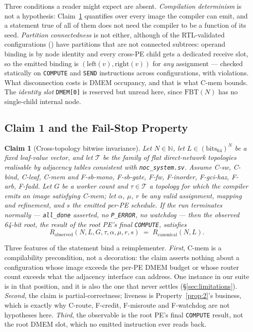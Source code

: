 \documentclass[journal,10pt]{IEEEtran}
\theoremstyle{plain}
\newtheorem{claim}{Claim}
\theoremstyle{definition}
\theoremstyle{remark}
\newcommand{\FBT}{\ensuremath{\mathrm{FBT}}}
\newcommand{\Rcan}{\ensuremath{R_{\mathrm{canonical}}}}
\newcommand{\sv}[1]{\texttt{#1}}
\newcommand{\T}{\ensuremath{\mathcal{T}}}
\newcommand{\asgn}{\ensuremath{\alpha}}
\newcommand{\map}{\ensuremath{\mu}}
\begin{document}
Three conditions a reader might expect are absent. \emph{Compilation
determinism} is not a hypothesis: Claim~\ref{claim:1} quantifies over every
image the compiler can emit, and a statement true of all of them does not need
the compiler to be a function of its seed. \emph{Partition connectedness} is
not either, although \DisconnCount{} of the RTL-validated configurations
(\DisconnShare{}) have partitions that are not connected subtrees: operand
binding is by node identity and every cross-PE child gets a dedicated receive
slot, so the emitted binding is $(\mathrm{left}(v),\mathrm{right}(v))$ for
\emph{any} assignment --- checked statically on \BindComputes{}
\texttt{COMPUTE} and \BindSends{} \texttt{SEND} instructions across
\BindConfigs{} configurations, with \BindViolations{} violations. What
disconnection costs is DMEM occupancy, and that is what \textsf{C-mem} bounds.
The \emph{identity slot} \texttt{DMEM[0]} is reserved but unread here, since
$\FBT(N)$ has no single-child internal node.

\subsection{Claim 1 and the Fail-Stop Property}\label{sec:abi-claim}

\begin{claim}[Cross-topology bitwise invariance]\label{claim:1}
Let $N \in \mathbb{N}$, let $L \in (\mathrm{bits}_{64})^N$ be a fixed
leaf-value vector, and let $\T$ be the family of flat direct-network
topologies realisable by adjacency tables consistent with
\sv{noc\_system.sv}. Assume \textsf{C-sw}, \textsf{C-bind}, \textsf{C-leaf},
\textsf{C-mem} and \textsf{F-sb-mono}, \textsf{F-sb-gate}, \textsf{F-fw},
\textsf{F-inorder}, \textsf{F-gci-haz}, \textsf{F-arb}, \textsf{F-fadd}. Let
$G$ be a worker count and $\tau \in \T$ a topology for which the compiler
emits an image satisfying \textsf{C-mem}; let $\asgn$, $\map$, $r$ be any
valid assignment, mapping and refinement, and $s$ the emitted per-PE schedule.
If the run terminates normally --- \sv{all\_done} asserted, no
\texttt{P\_ERROR}, no watchdog --- then the observed 64-bit root, the result
of the root PE's final \texttt{COMPUTE}, satisfies
\begin{equation}
  R_\mathrm{observed}(N, L, G, \tau, \asgn, \map, r, s)
    \;=\; \Rcan(N, L).
\end{equation}
\end{claim}

Three features of the statement bind a reimplementer. \emph{First},
\textsf{C-mem} is a compilability precondition, not a decoration: the claim
asserts nothing about a configuration whose image exceeds the per-PE DMEM
budget or whose router count exceeds what the adjacency interface can address.
One instance in our suite is in that position, and it is also the one that
never settles (\S\ref{sec:limitations}). \emph{Second}, the claim is
partial-correctness; liveness is Property~\ref{prop:2}'s business, which is
exactly why \textsf{C-route}, \textsf{F-credit}, \textsf{F-misroute} and
\textsf{F-watchdog} are not hypotheses here. \emph{Third}, the observable is
the root PE's final \texttt{COMPUTE} result, not the root DMEM slot, which no
emitted instruction ever reads back.
\end{document}
